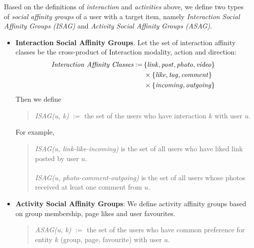 
Based on the definitions of {\em interaction}  and {\em activities} above, 
we define two types of {\em social affinity groups} of a user with a target item,
namely \textit{Interaction  Social Affinity Groups (ISAG)} and \textit{Activity Social Affinity Groups (ASAG)}.

\begin{itemize}
  \item \textbf{Interaction  Social Affinity Groups}. Let the set of interaction affinity classes be the cross-product of 
  Interaction modality, action and direction:
  \begin{align*}
  	\textit{Interaction Affinity Classes} := \, & \{\link, \post, \photo, \video\} \\
                                                & \times \{\like, \ttag, \comment\} \\
                                                & \times \{\incoming, \outgoing\}
  \end{align*}
  Then we define 
  \begin{quote}
  \textit{ISAG(u, k)} $:=$ the set of the users who have interaction $k$ with user $u$.
  \end{quote}
   For example,
   \begin{quote}
   
   \textit{ISAG(u, link-like-incoming)}  is the set of all users who have liked link posted by user $u$. \\
   \\
   \textit{ISAG(u, photo-comment-outgoing)} is the set of all users whose photos received at least one comment from $u$.
   \end{quote}
\item \textbf{Activity Social Affinity Groups}: We define activity affinity groups based on group membership, page likes and user favourites.
	\begin{quote}
	\textit{ASAG(u, k)} $:=$ the set of the users who have common preference for entity $k$ (group, page, favourite) with user $u$.   
	\end{quote}
\end{itemize}


